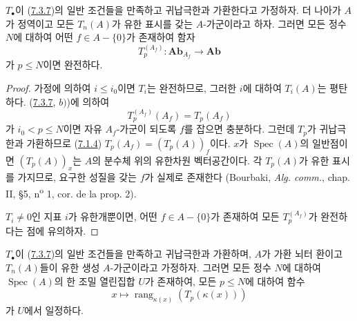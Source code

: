 \begin{corollary}[7.3.9]
\label{III.7.3.9-fr}
$T_\bullet$이 (\hyperref[III.7.3.7-fr]{7.3.7})의 일반 조건들을 만족하고
귀납극한과 가환한다고 가정하자. 더 나아가 $A$가 정역이고 모든
$T_n(A)$가 유한 표시를 갖는 $A$-가군이라고 하자. 그러면 모든 정수
$N$에 대하여 어떤 $f\in A-\{0\}$가 존재하여 함자
\[
  T_p^{(A_f)}:\mathbf{Ab}_{A_f}\longrightarrow\mathbf{Ab}
\]
가 $p\leq N$이면 완전하다.
\end{corollary}

\begin{proof}
가정에 의하여 $i\leq i_0$이면 $T_i$는 완전하므로, 그러한 $i$에
대하여 $T_i(A)$는 평탄하다. (\hyperref[III.7.3.7-fr]{7.3.7}, $b)$)에
의하여
\[
  T_p^{(A_f)}(A_f)=T_p(A_f)
\]
가 $i_0<p\leq N$이면 자유 $A_f$-가군이 되도록 $f$를 잡으면 충분하다.
그런데 $T_p$가 귀납극한과 가환하므로
(\hyperref[III.7.1.4-fr]{7.1.4})
$T_p(A_f)=(T_p(A))_f$이다. $x$가 $\operatorname{Spec}(A)$의
일반점이면 $(T_p(A))_x$는 $A$의 분수체 위의 유한차원 벡터공간이다.
각 $T_p(A)$가 유한 표시를 가지므로, 요구한 성질을 갖는 $f$가 실제로
존재한다 (Bourbaki, \emph{Alg. comm.}, chap. II, \S 5,
n\textsuperscript{o} 1, cor. de la prop. 2).

$T_i\ne0$인 지표 $i$가 유한개뿐이면, 어떤 $f\in A-\{0\}$가 존재하여
모든 $T_p^{(A_f)}$가 완전하다는 점에 유의하자.
\end{proof}

\begin{corollary}[7.3.10]
\label{III.7.3.10-fr}
$T_\bullet$이 (\hyperref[III.7.3.7-fr]{7.3.7})의 일반 조건들을 만족하고
귀납극한과 가환하며, $A$가 가환 뇌터 환이고 $T_n(A)$들이 유한 생성
$A$-가군이라고 가정하자. 그러면 모든 정수 $N$에 대하여
$\operatorname{Spec}(A)$의 한 조밀 열린집합 $U$가 존재하여, 모든
$p\leq N$에 대하여 함수
\[
  x\mapsto\operatorname{rang}_{\kappa(x)}(T_p(\kappa(x)))
\]
가 $U$에서 일정하다.
\end{corollary}

